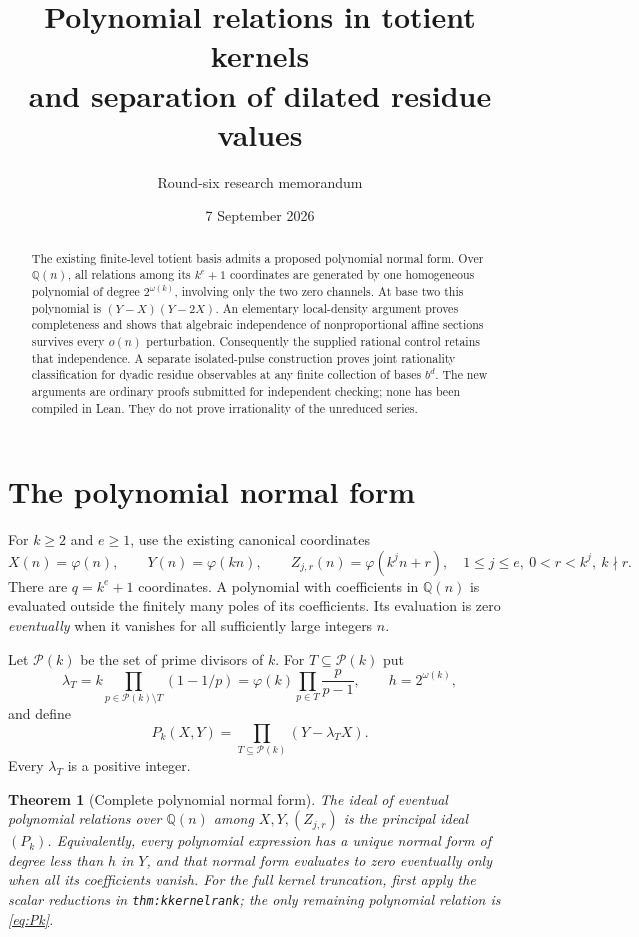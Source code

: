 \documentclass[11pt,a4paper]{article}
\title{Polynomial relations in totient kernels\\and separation of dilated residue values}
\author{Round-six research memorandum}
\date{7 September 2026}
\newtheorem{theorem}{Theorem}[section]
\theoremstyle{definition}\newtheorem{definition}[theorem]{Definition}
\theoremstyle{remark}\newtheorem{remark}[theorem]{Remark}
\newcommand{\Q}{\mathbb Q}\newcommand{\R}{\mathbb R}\newcommand{\Z}{\mathbb Z}\newcommand{\N}{\mathbb N}
\newcommand{\ph}{\varphi}\newcommand{\rad}{\operatorname{rad}}
\begin{document}
\maketitle
\begin{abstract}
The existing finite-level totient basis admits a proposed polynomial normal form.
Over $\Q(n)$, all relations among its $k^e+1$ coordinates are generated by one
homogeneous polynomial of degree $2^{\omega(k)}$, involving only the two zero
channels. At base two this polynomial is $(Y-X)(Y-2X)$.
An elementary local-density argument proves completeness and shows that algebraic
independence of nonproportional affine sections survives every $o(n)$ perturbation.
Consequently the supplied rational control retains that independence.
A separate isolated-pulse construction proves joint rationality classification
for dyadic residue observables at any finite collection of bases $b^d$.
The new arguments are ordinary proofs submitted for independent checking; none
has been compiled in Lean. They do not prove irrationality of the unreduced series.
\end{abstract}

\section{The polynomial normal form}
For $k\ge2$ and $e\ge1$, use the existing canonical coordinates
\[
 X(n)=\ph(n),\qquad Y(n)=\ph(kn),\qquad
 Z_{j,r}(n)=\ph(k^j n+r),
 \quad 1\le j\le e,\ 0<r<k^j,\ k\nmid r.
\]
There are $q=k^e+1$ coordinates. A polynomial with coefficients in $\Q(n)$
is evaluated outside the finitely many poles of its coefficients. Its evaluation
is zero \emph{eventually} when it vanishes for all sufficiently large integers $n$.

Let $\mathcal P(k)$ be the set of prime divisors of $k$. For $T\subseteq\mathcal P(k)$ put
\[
 \lambda_T=k\prod_{p\in\mathcal P(k)\setminus T}(1-1/p)
 =\ph(k)\prod_{p\in T}\frac p{p-1},\qquad h=2^{\omega(k)},
\]
and define
\begin{equation}\label{eq:Pk}
 P_k(X,Y)=\prod_{T\subseteq\mathcal P(k)}(Y-\lambda_T X).
\end{equation}
Every $\lambda_T$ is a positive integer.

\begin{theorem}[Complete polynomial normal form]\label{thm:kernel-algebra}
The ideal of eventual polynomial relations over $\Q(n)$ among
$X,Y,(Z_{j,r})$ is the principal ideal $(P_k)$.
Equivalently, every polynomial expression has a unique normal form of degree
less than $h$ in $Y$, and that normal form evaluates to zero eventually only
when all its coefficients vanish.
For the full kernel truncation, first apply the scalar reductions in
\texttt{thm:kkernelrank}; the only remaining polynomial relation is \eqref{eq:Pk}.
\end{theorem}
\end{document}
